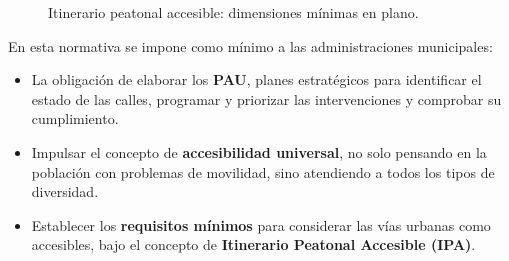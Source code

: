 \begin{figure}[htbp]
  \caption{Itinerario peatonal accesible: dimensiones mínimas en plano.}
  \label{fig:ipa-plano}
\end{figure}

En esta normativa se impone como mínimo a las administraciones municipales:
\begin{itemize}
    \item La obligación de elaborar los \textbf{\gls{PAU}}, planes estratégicos para identificar el estado de las calles, programar y priorizar las intervenciones y comprobar su cumplimiento.
    \item Impulsar el concepto de \textbf{accesibilidad universal}, no solo pensando en la población con problemas de movilidad, sino atendiendo a todos los tipos de diversidad.
    \item Establecer los \textbf{requisitos mínimos} para considerar las vías urbanas como accesibles, bajo el concepto de \textbf{Itinerario Peatonal Accesible (IPA)}.
\end{itemize}
 
